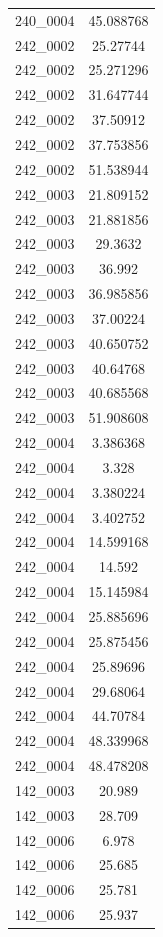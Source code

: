 \begin{table}[H]
\begin{tabular}{|c|c|}
        240\_0004 & 45.088768 \\
        242\_0002 & 25.27744 \\
        242\_0002 & 25.271296 \\
        242\_0002 & 31.647744 \\
        242\_0002 & 37.50912 \\
        242\_0002 & 37.753856 \\
        242\_0002 & 51.538944 \\
        242\_0003 & 21.809152 \\
        242\_0003 & 21.881856 \\
        242\_0003 & 29.3632 \\
        242\_0003 & 36.992 \\
        242\_0003 & 36.985856 \\
        242\_0003 & 37.00224 \\
        242\_0003 & 40.650752 \\
        242\_0003 & 40.64768 \\
        242\_0003 & 40.685568 \\
        242\_0003 & 51.908608 \\
        242\_0004 & 3.386368 \\
        242\_0004 & 3.328 \\
        242\_0004 & 3.380224 \\
        242\_0004 & 3.402752 \\
        242\_0004 & 14.599168 \\
        242\_0004 & 14.592 \\
        242\_0004 & 15.145984 \\
        242\_0004 & 25.885696 \\
        242\_0004 & 25.875456 \\
        242\_0004 & 25.89696 \\
        242\_0004 & 29.68064 \\
        242\_0004 & 44.70784 \\
        242\_0004 & 48.339968 \\
        242\_0004 & 48.478208 \\
        142\_0003 & 20.989 \\
        142\_0003 & 28.709 \\
        142\_0006 & 6.978 \\
        142\_0006 & 25.685 \\
        142\_0006 & 25.781 \\
        142\_0006 & 25.937 \\

\end{tabular}
\end{table}
